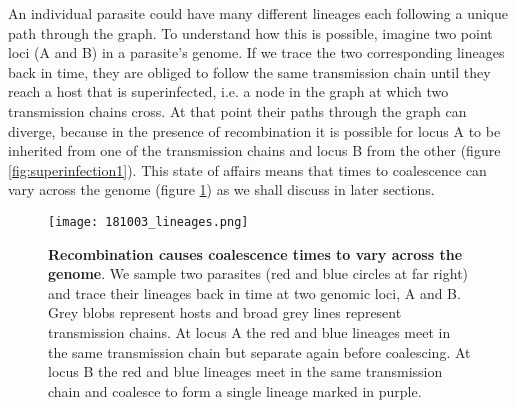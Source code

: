 \documentclass[_main.tex]{subfiles}
\begin{document}
An individual parasite could have many different lineages each following a unique path through the graph.  To understand how this is possible, imagine two point loci (A and B) in a parasite's genome.  If we trace the two corresponding lineages back in time, they are obliged to follow the same transmission chain until they reach a host that is superinfected, i.e. a node in the graph at which two transmission chains cross.  At that point their paths through the graph can diverge, because in the presence of recombination it is possible for locus A to be inherited from one of the transmission chains and locus B from the other (figure \ref{fig:superinfection1}).  This state of affairs means that times to coalescence can vary across the genome (figure \ref{fig:diff_lineage}) as we shall discuss in later sections.   

\begin{figure}[h!]
\centering
\texttt{[image: 181003\_lineages.png]}
\caption{\textbf{Recombination causes coalescence times to vary across the genome}.  We sample two parasites (red and blue circles at far right) and trace their lineages back in time at two genomic loci, A and B.  Grey blobs represent hosts and broad grey lines represent transmission chains.  At locus A the red and blue lineages meet in the same transmission chain but separate again before coalescing.  At locus B the red and blue lineages meet in the same transmission chain and coalesce to form a single lineage marked in purple.}
\label{fig:diff_lineage}
\end{figure}



\end{document}
